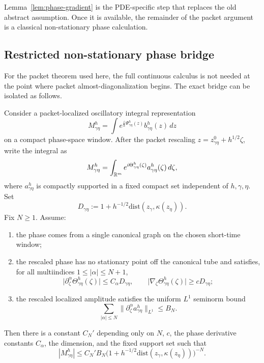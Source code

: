 Lemma~\ref{lem:phase-gradient} is the PDE-specific step that replaces the old abstract assumption. Once it is available, the remainder of the packet argument is a classical non-stationary phase calculation.

\subsection{Restricted non-stationary phase bridge}

For the packet theorem used here, the full continuous calculus is not needed at the point where packet almost-diagonalization begins. The exact bridge can be isolated as follows.

\begin{proposition}
\label{prop:restricted-nsp-appendix}
Consider a packet-localized oscillatory integral representation
\[
M_{\gamma\eta}^h
=
\int e^{\frac{i}{h}\Psi_{\gamma\eta}^h(z)} b_{\gamma\eta}^h(z)\,dz
\]
on a compact phase-space window.  After the packet rescaling
$z=z_{\gamma\eta}^0+h^{1/2}\zeta$, write the integral as
\[
M_{\gamma\eta}^h
=
\int_{\mathbb R^m} e^{i\Theta_{\gamma\eta}^h(\zeta)}
  a_{\gamma\eta}^h(\zeta)\,d\zeta,
\]
where $a_{\gamma\eta}^h$ is compactly supported in a fixed compact set
independent of $h,\gamma,\eta$.  Set
\[
D_{\gamma\eta}
:=
1+h^{-1/2}\mathrm{dist}(z_\gamma,\kappa(z_\eta)).
\]
Fix $N\ge 1$.  Assume:
\begin{enumerate}
\item the phase comes from a single canonical graph on the chosen short-time window;
\item the rescaled phase has no stationary point off the canonical tube and satisfies, for all multiindices $1\le |\alpha|\le N+1$,
\[
\bigl|\partial_\zeta^\alpha \Theta_{\gamma\eta}^h(\zeta)\bigr|
\le C_\alpha D_{\gamma\eta},
\qquad
\bigl|\nabla_\zeta \Theta_{\gamma\eta}^h(\zeta)\bigr|
\ge cD_{\gamma\eta};
\]
\item the rescaled localized amplitude satisfies the uniform $L^1$ seminorm bound
\[
\sum_{|\alpha|\le N}
\|\partial_\zeta^\alpha a_{\gamma\eta}^h\|_{L^1}
\le B_N .
\]
\end{enumerate}
Then there is a constant $C_N'$ depending only on $N$, $c$, the phase derivative constants $C_\alpha$, the dimension, and the fixed support set such that
\[
|M_{\gamma\eta}^h|
\le
C_N' B_N
\bigl(1+h^{-1/2}\mathrm{dist}(z_\gamma,\kappa(z_\eta))\bigr)^{-N}.
\]
\end{proposition}


